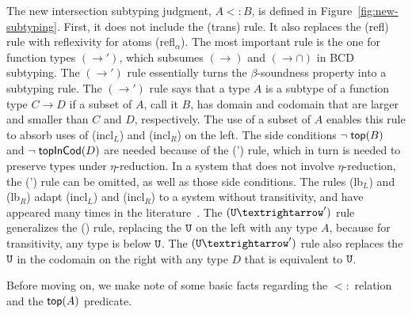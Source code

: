 \documentclass{article}
\begin{document}
The new intersection subtyping judgment, $A <: B$, is defined in
Figure~\ref{fig:new-subtyping}. First, it does not include the (trans)
rule.  It also replaces the (refl) rule with reflexivity for atoms
(refl$_α$). The most important rule is the one for function types
$(→')$, which subsumes $(→)$ and $({→}{∩})$ in BCD subtyping.  The
$(→')$ rule essentially turns the $\beta$-soundness property into a
subtyping rule. The $(→')$ rule says that a type $A$ is a subtype of a
function type $C → D$ if a subset of $A$, call it $B$, has domain and
codomain that are larger and smaller than $C$ and $D$,
respectively. The use of a subset of $A$ enables this rule to absorb
uses of (incl$_L$) and (incl$_R$) on the left.  The side conditions
$\neg\;\mathsf{top}(B)$ and $\neg\;\mathsf{topInCod}(D)$ are needed because of the
(') rule, which in turn is needed to preserve types under
$\eta$-reduction.  In a system that does not involve $\eta$-reduction,
the (') rule can be omitted, as well as those side
conditions. The rules (lb$_L$) and (lb$_R$) adapt (incl$_L$) and
(incl$_R$) to a system without transitivity, and have appeared many
times in the literature~\citep{Bakel:1995aa}.  The $(\TOP{→}')$ rule
generalizes the () rule, replacing the $\mathtt{U}$ on the left with
any type $A$, because for transitivity, any type is below $\mathtt{U}$. The
$(\TOP{→}')$ rule also replaces the $\mathtt{U}$ in the codomain on the
right with any type $D$ that is equivalent to $\mathtt{U}$.

Before moving on, we make note of some basic facts regarding the $<:$
relation and the $\mathsf{top}(A)$ predicate.
\end{document}

